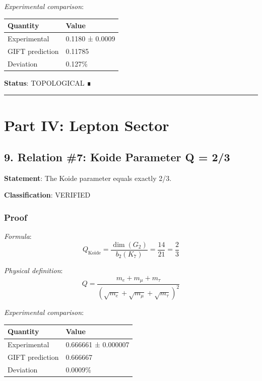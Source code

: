 \documentclass[11pt,a4paper]{article}
\begin{document}
\emph{Experimental comparison}:

{\def\LTcaptype{none} %
\begin{longtable}[]{@{}ll@{}}
\toprule\noalign{}
Quantity & Value \\
\midrule\noalign{}
\endhead
\bottomrule\noalign{}
\endlastfoot
Experimental & 0.1180 ± 0.0009 \\
GIFT prediction & 0.11785 \\
Deviation & 0.127\% \\
\end{longtable}
}

\textbf{Status}: TOPOLOGICAL ∎

\begin{center}\rule{0.5\linewidth}{0.5pt}\end{center}

\section{Part IV: Lepton Sector}\label{part-iv-lepton-sector}

\subsection{9. Relation \#7: Koide Parameter Q = 2/3}\label{relation-7-koide-parameter-q-23}

\textbf{Statement}: The Koide parameter equals exactly 2/3.

\textbf{Classification}: VERIFIED

\subsubsection{Proof}\label{proof-5}

\emph{Formula}:
\[Q_{\text{Koide}} = \frac{\dim(G_2)}{b_2(K_7)} = \frac{14}{21} = \frac{2}{3}\]

\emph{Physical definition}:
\[Q = \frac{m_e + m_\mu + m_\tau}{(\sqrt{m_e} + \sqrt{m_\mu} + \sqrt{m_\tau})^2}\]

\emph{Experimental comparison}:

{\def\LTcaptype{none} %
\begin{longtable}[]{@{}ll@{}}
\toprule\noalign{}
Quantity & Value \\
\midrule\noalign{}
\endhead
\bottomrule\noalign{}
\endlastfoot
Experimental & 0.666661 ± 0.000007 \\
GIFT prediction & 0.666667 \\
Deviation & 0.0009\% \\
\end{longtable}
}
\end{document}
